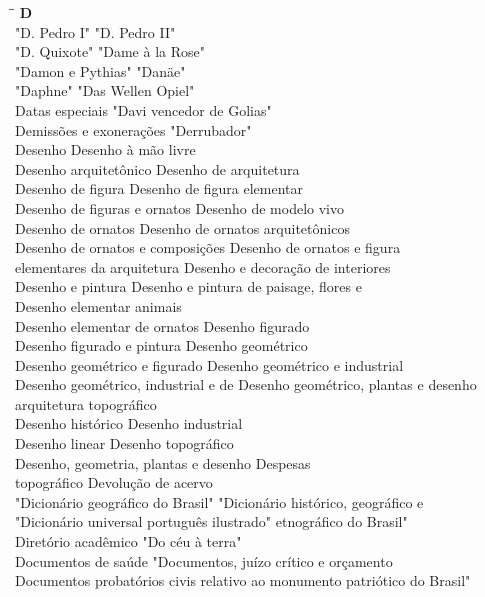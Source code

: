 \begin{tabbing}
	\hspace{8,7cm}\=\hspace{1cm}\=\kill
	\textbf{D} \>  \\ 
	"D. Pedro I"	\> "D. Pedro II"\\
	"D. Quixote" \> "Dame à la Rose"\\
	"Damon e Pythias" \> "Danäe"\\
	"Daphne" \> "Das Wellen Opiel"\\ 
	Datas especiais \>  "Davi vencedor de Golias"\\ 
	Demissões e exonerações \> "Derrubador"\\ 
	Desenho \> Desenho à mão livre\\
	Desenho arquitetônico \> Desenho de arquitetura\\
	Desenho de figura	\> Desenho de figura elementar\\
	Desenho de figuras e ornatos \> Desenho de modelo vivo\\
	Desenho de ornatos \> Desenho de ornatos arquitetônicos\\
	Desenho de ornatos e composições \> Desenho de ornatos e figura\\ 
	elementares da arquitetura \> Desenho e decoração de interiores  \\ 
	Desenho e pintura \> Desenho e pintura de paisage, flores e\\ 
	Desenho elementar \> animais\\
	Desenho elementar de ornatos \> Desenho figurado \\		
	Desenho figurado e pintura	\> Desenho geométrico\\
	Desenho geométrico e figurado \> Desenho geométrico e industrial\\
	Desenho geométrico, industrial e de \> Desenho geométrico, plantas e desenho\\
	arquitetura \> topográfico\\ 
	Desenho histórico \>  Desenho industrial\\ 
	Desenho linear \> Desenho topográfico\\ 
	Desenho, geometria, plantas e desenho \> Despesas\\
	topográfico \> Devolução de acervo\\ 
	"Dicionário geográfico do Brasil" \> "Dicionário histórico, geográfico e\\
	"Dicionário universal português ilustrado" \> etnográfico do Brasil" \\	  	   
	Diretório acadêmico \> "Do céu à terra"\\
	Documentos de saúde \> "Documentos, juízo crítico e orçamento\\
	Documentos probatórios civis \> relativo ao monumento patriótico do Brasil"\\
\end{tabbing}

